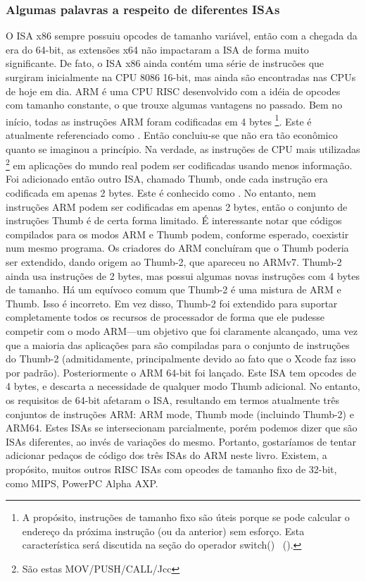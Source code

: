 %
%
%

\subsubsection{Algumas palavras a respeito de diferentes \ac{ISA}s}
O \ac{ISA} x86 sempre possuiu opcodes de tamanho variável, então com a chegada da era do 64-bit, as extensões x64 não impactaram a \ac{ISA} de forma muito significante. De fato, o \ac{ISA} x86 ainda contém uma série de instrucões que surgiram inicialmente na CPU 8086 16-bit, mas ainda são encontradas nas CPUs de hoje em dia.
ARM é uma \ac{CPU} \ac{RISC} desenvolvido com a idéia de opcodes com tamanho constante, o que trouxe algumas vantagens no passado.
Bem no início, todas as instruções ARM foram codificadas em 4 bytes%
\footnote{A propósito, instruções de tamanho fixo são úteis porque se pode calcular o endereço da próxima instrução (ou da anterior) sem esforço. Esta característica será discutida na seção do operador switch() ~().}.
Este é atualmente referenciado como .
Então concluiu-se que não era tão econômico quanto se imaginou a princípio.
Na verdade, as instruções de \ac{CPU} mais utilizadas \footnote{São estas MOV/PUSH/CALL/Jcc} em aplicações do mundo real podem ser codificadas usando menos informação.
Foi adicionado então outro \ac{ISA}, chamado Thumb, onde cada instrução era codificada em apenas 2 bytes.
Este é conhecido como .
No entanto, nem  instruções ARM podem ser codificadas em apenas 2 bytes, então o conjunto de instruções Thumb é de certa forma limitado.
É interessante notar que códigos compilados para os modos ARM e Thumb podem, conforme esperado, coexistir num mesmo programa.
Os criadores do ARM concluíram que o Thumb poderia ser extendido, dando origem ao Thumb-2, que apareceu no ARMv7.
Thumb-2 ainda usa instruções de 2 bytes, mas possui algumas novas instruções com 4 bytes de tamanho.
Há um equívoco comum que Thumb-2 é uma mistura de ARM e Thumb. Isso é incorreto.
Em vez disso, Thumb-2 foi extendido para suportar completamente todos os recursos de processador de forma que ele pudesse competir com o modo ARM---um objetivo que foi claramente alcançado, uma vez que a maioria das aplicações para \idevices são compiladas para o conjunto de instruções do Thumb-2 (admitidamente, principalmente devido ao fato que o Xcode faz isso por padrão).
Posteriormente o ARM 64-bit foi lançado. Este \ac{ISA} tem opcodes de 4 bytes, e descarta a necessidade de qualquer modo Thumb adicional.
No entanto, os requisitos de 64-bit afetaram o \ac{ISA}, resultando em termos atualmente três conjuntos de instruções ARM: ARM mode, Thumb mode (incluindo Thumb-2) e ARM64.
Estes \ac{ISA}s se intersecionam parcialmente, porém podemos dizer que são \ac{ISA}s diferentes, ao invés de variações do mesmo.
Portanto, gostaríamos de tentar adicionar pedaços de código dos três \ac{ISA}s do ARM neste livro.
%
%
%
Existem, a propósito, muitos outros \ac{RISC} \ac{ISA}s com opcodes de tamanho fixo de 32-bit, como MIPS, PowerPC \PTBRph{} Alpha AXP.
